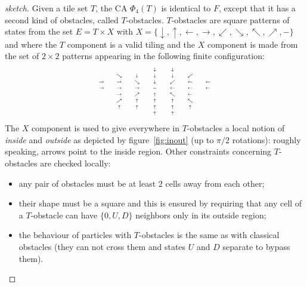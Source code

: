 \documentclass{llncs}
\newcommand{\acf}{F}
\newcommand{\oT}{\downarrow}
\newcommand{\oB}{\uparrow}
\newcommand{\oL}{\rightarrow}
\newcommand{\oR}{\leftarrow}
\newcommand{\oTL}{\searrow}
\newcommand{\oTR}{\swarrow}
\newcommand{\oBL}{\nearrow}
\newcommand{\oBR}{\nwarrow}
\newcommand{\minislot}[1]{\text{\hbox to.4cm{\hfill\vbox to.2cm{\vfill \hbox{$#1$}\vfill}\hfill}}}
\newcommand{\phiemboit}{\Phi_4}
\newcommand{\outo}{-}
\begin{document}
\begin{proof}[sketch]
  Given a tile set $T$, the CA $\phiemboit(T)$ is identical to $\acf$,
  except that it has a second kind of obstacles, called $T$-obstacles.
  $T$-obstacles are square patterns of states from the set ${E=T\times
    X}$ with ${X=\{\oT,\oB,\oR,\oL,\oTR,\oTL,\oBR,\oBL,\outo\}}$ and
  where the $T$ component is a valid tiling and the $X$ component is
  made from the set of ${2\times 2}$ patterns appearing in the
  following finite configuration:
  \[\tiny
  \begin{matrix}
&&&  \minislot{\oT} & \minislot{\oT} \\
     &\minislot{\oTL} & \minislot{\oT} & \minislot{\oT} & \minislot{\oT} & \minislot{\oTR} \\
     \minislot{\oL}&\minislot{\oL} & \minislot{\oTL} & \minislot{\oT} & \minislot{\oTR} & \minislot{\oR}& \minislot{\oR} \\
     \minislot{\oL}&\minislot{\oL} & \minislot{\oL} & \minislot{\outo} & \minislot{\oR} & \minislot{\oR}& \minislot{\oR} \\
     &\minislot{\oL} & \minislot{\oBL} & \minislot{\oB} & \minislot{\oBR} & \minislot{\oR}  \\
     &\minislot{\oBL} & \minislot{\oB} & \minislot{\oB} & \minislot{\oB} & \minislot{\oBR}  \\
     &\minislot{\oB} & \minislot{\oB} & \minislot{\oB} & \minislot{\oB} & \minislot{\oB}  \\
     &&&  \minislot{\oB} & \minislot{\oB} \\
\end{matrix}
  \]
  The $X$ component is used to give everywhere in $T$-obstacles a
  local notion of \emph{inside} and \emph{outside} as depicted by
  figure~\ref{fig:inout} (up to $\pi/2$ rotations): roughly speaking,
  arrows point to the inside region.  Other constraints concerning
  $T$-obstacles are checked locally:
  \begin{itemize}
  \item any pair of obstacles must be at least $2$ cells away from
    each other;
  \item their shape must be a square and this is ensured by requiring
    that any cell of a $T$-obstacle can have ${\{0,U,D\}}$ neighbors
    only in its outside region;
  \item the behaviour of particles with $T$-obstacles is the same as
    with classical obstacles (they can not cross them and states $U$
    and $D$ separate to bypass them).
  \end{itemize}  

\end{proof}
\end{document}
